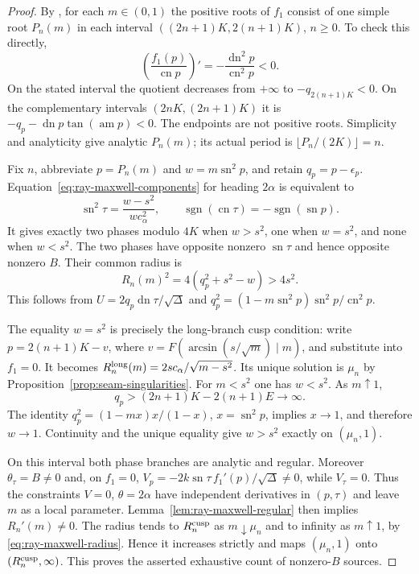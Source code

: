 \documentclass[11pt,a4paper]{article}
\theoremstyle{remark}\newtheorem{remark}[theorem]{Remark}
\newcommand{\sn}{\operatorname{sn}}
\newcommand{\cn}{\operatorname{cn}}
\newcommand{\dn}{\operatorname{dn}}
\begin{document}
\begin{proof}
By \cite[Lemma 5.3]{MS}, for each $m\in(0,1)$ the positive roots
of $f_1$ consist of one
simple root $P_n(m)$ in each interval
$((2n+1)K,2(n+1)K)$, $n\ge0$. To check this directly,
\[
 \left(\frac{f_1(p)}{\cn p}\right)'
       =-\frac{\dn^2p}{\cn^2p}<0.
\]
On the stated interval the quotient decreases from $+\infty$ to
$-q_{2(n+1)K}<0$. On the complementary intervals
$(2nK,(2n+1)K)$ it is $-q_p-\dn p\tan(\operatorname{am}p)<0$.
The endpoints are not positive roots. Simplicity and analyticity give
analytic $P_n(m)$; its actual period is
$\lfloor P_n/(2K)\rfloor=n$.

Fix $n$, abbreviate $p=P_n(m)$ and $w=m\sn^2p$, and retain
$q_p=p-\epsilon_p$. Equation~\eqref{eq:ray-maxwell-components}
for heading $2\alpha$ is equivalent to
\begin{equation}\label{eq:ray-maxwell-phase}
 \sn^2\tau=\frac{w-s^2}{wc_\alpha^2},\qquad
 \operatorname{sgn}(\cn\tau)=-\operatorname{sgn}(\sn p).
\end{equation}
It gives exactly two phases modulo $4K$ when $w>s^2$, one
when $w=s^2$, and none when $w<s^2$. The two phases have
opposite nonzero $\sn\tau$ and hence opposite nonzero $B$.
Their common radius is
\begin{equation}\label{eq:ray-maxwell-radius}
 R_n(m)^2=4(q_p^2+s^2-w)>4s^2.
\end{equation}
This follows from $U=2q_p\dn\tau/\sqrt\Delta$ and
$q_p^2=(1-m\sn^2p)\sn^2p/\cn^2p$.

The equality $w=s^2$ is precisely the long-branch cusp condition:
write $p=2(n+1)K-v$, where
$v=F(\arcsin(s/\sqrt m)\mid m)$, and substitute into $f_1=0$.
It becomes $R_n^{\rm long}(m)=2sc_\alpha/\sqrt{m-s^2}$.
Its unique solution is $\mu_n$ by
Proposition~\ref{prop:seam-singularities}.
For $m<s^2$ one has $w<s^2$. As $m\uparrow1$,
\[
 q_p>(2n+1)K-2(n+1)E\longrightarrow\infty.
\]
The identity $q_p^2=(1-mx)x/(1-x)$, $x=\sn^2p$, implies
$x\to1$, and therefore $w\to1$. Continuity and the unique equality
give $w>s^2$ exactly on $(\mu_n,1)$.

On this interval both phase branches are analytic and regular.
Moreover $\theta_\tau=B\ne0$ and, on $f_1=0$,
$V_p=-2k\sn\tau\,f_1'(p)/\sqrt\Delta\ne0$, while $V_\tau=0$.
Thus the constraints $V=0$, $\theta=2\alpha$ have independent
derivatives in $(p,\tau)$ and leave $m$ as a local parameter.
Lemma~\ref{lem:ray-maxwell-regular} then implies $R_n'(m)\ne0$.
The radius tends to $R_n^{\rm cusp}$ as $m\downarrow\mu_n$
and to infinity as $m\uparrow1$, by
\eqref{eq:ray-maxwell-radius}. Hence it increases strictly and
maps $(\mu_n,1)$ onto $(R_n^{\rm cusp},\infty)$.
This proves the asserted exhaustive count of nonzero-$B$ sources.


\end{proof}
\end{document}
